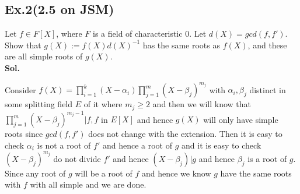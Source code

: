 \documentclass[lang=en,11pt,a4paper,citestyle =authoryear]{elegantpaper}
\begin{document}
\subsection*{Ex.2(2.5 on JSM)}
Let $f\in F[X]$, where $F$ is a field of characteristic $0$. Let $d(X) = gcd(f,f')$. Show that $g(X):=f(X)d(X)^{-1}$ has the same roots as $f(X)$, and these are all simple roots of $g(X)$.
\vspace{0.5em}\\
\textbf{Sol.} \par
\iffalse
Since char$(F)=0$, $F$ is perfect.  Clearly, all roots of $g(x)$ are roots of $f(x)$. 

Notice that in the splitting field of $f=\prod_{i=1}^k(x-x_i)^{n_i}$, we have $f'=\sum_{i=1}^k n_i\frac{f(x)}{x-x_i}$, so $\gcd(f,f')=\prod_{n_i>1}(x-x_i)^{n_i-1}$. By comparing the roots, we see every root of $f(x)$ will be a root of $g(x)$, and every root of $g(x)$ has single multiplicity because its degree is 1.
\fi
Consider $f(X) = \prod_{i=1}^k (X-\alpha_i)\prod_{j=1}^m (X-\beta_j)^{m_j}$ with $\alpha_i,\beta_j$ distinct in some splitting field $E$ of it where $m_j \geq 2$ and then we will know that $\prod_{j=1}^m (X-\beta_j)^{m_j-1}| f,f$ in $E[X]$ and hence $g(X)$ will only have simple roots since $gcd(f,f')$ does not change with the extension. Then it is easy to check $\alpha_i$ is not a root of $f'$ and hence a root of $g$ and it is easy to check $(X-\beta_j)^{m_j}$ do not divide $f'$ and hence $(X-\beta_j)|g$ and hence $\beta_j$ is a root of $g$. Since any root of $g$ will be a root of $f$ and hence we know $g$ have the same roots with $f$ with all simple and we are done.
\par 
\vspace{0.5em}
\end{document}
